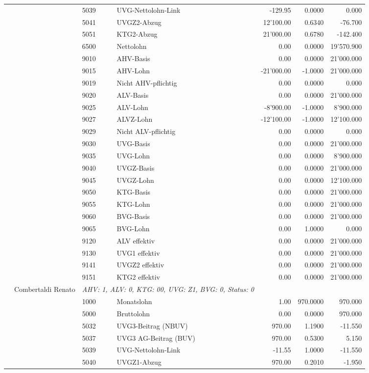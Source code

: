 \documentclass[15pt,a4paper]{article}
\begin{document}
\begin{longtable}{@{\extracolsep{\fill}}l l l l|r|r|r}
&&5039&UVG-Nettolohn-Link&-129.95&0.0000&0.000\\
&&5041&UVGZ2-Abzug&12'100.00&0.6340&-76.700\\
&&5051&KTG2-Abzug&21'000.00&0.6780&-142.400\\
&&6500&Nettolohn&0.00&0.0000&19'570.900\\
&&9010&AHV-Basis&0.00&0.0000&21'000.000\\
&&9015&AHV-Lohn&-21'000.00&-1.0000&21'000.000\\
&&9019&Nicht AHV-pflichtig&0.00&0.0000&0.000\\
&&9020&ALV-Basis&0.00&0.0000&21'000.000\\
&&9025&ALV-Lohn&-8'900.00&-1.0000&8'900.000\\
&&9027&ALVZ-Lohn&-12'100.00&-1.0000&12'100.000\\
&&9029&Nicht ALV-pflichtig&0.00&0.0000&0.000\\
&&9030&UVG-Basis&0.00&0.0000&21'000.000\\
&&9035&UVG-Lohn&0.00&0.0000&8'900.000\\
&&9040&UVGZ-Basis&0.00&0.0000&21'000.000\\
&&9045&UVGZ-Lohn&0.00&0.0000&12'100.000\\
&&9050&KTG-Basis&0.00&0.0000&21'000.000\\
&&9055&KTG-Lohn&0.00&0.0000&21'000.000\\
&&9060&BVG-Basis&0.00&0.0000&21'000.000\\
&&9065&BVG-Lohn&0.00&1.0000&0.000\\
&&9120&ALV effektiv&0.00&0.0000&21'000.000\\
&&9130&UVG1 effektiv&0.00&0.0000&21'000.000\\
&&9141&UVGZ2 effektiv&0.00&0.0000&21'000.000\\
&&9151&KTG2 effektiv&0.00&0.0000&21'000.000\\
\pagebreak
6&Combertaldi Renato&\multicolumn{2}{l|}{\small\emph{AHV: 1, ALV: 0, KTG: 00, UVG: Z1, BVG: 0, Status: 0}}&& \\
&&1000&Monatslohn&1.00&970.0000&970.000\\
&&5000&Bruttolohn&0.00&0.0000&970.000\\
&&5032&UVG3-Beitrag (NBUV)&970.00&1.1900&-11.550\\
&&5037&UVG3 AG-Beitrag (BUV)&970.00&0.5300&5.150\\
&&5039&UVG-Nettolohn-Link&-11.55&1.0000&-11.550\\
&&5040&UVGZ1-Abzug&970.00&0.2010&-1.950\\

\end{longtable}
\end{document}
